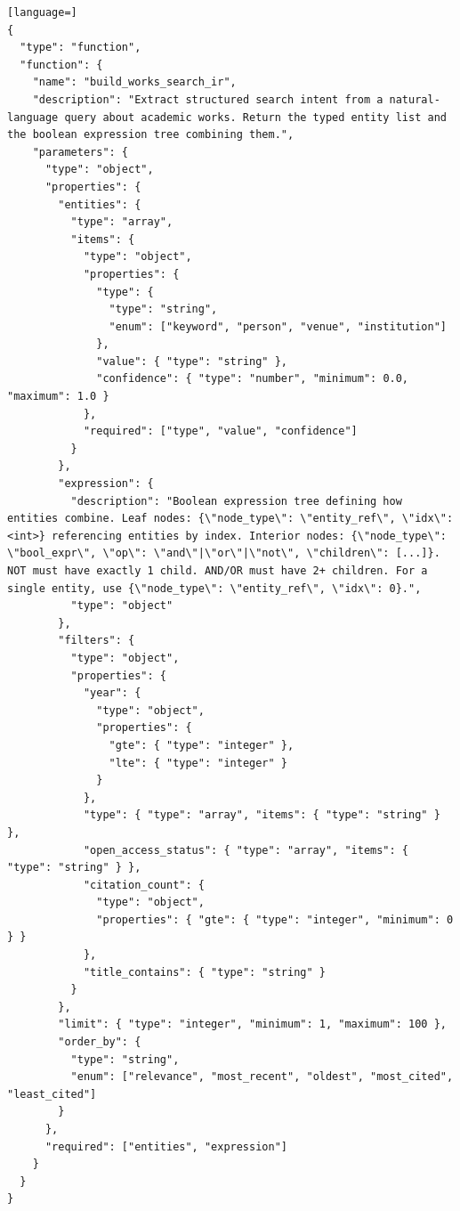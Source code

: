 \begin{lstlisting}[language=]
{
  "type": "function",
  "function": {
    "name": "build_works_search_ir",
    "description": "Extract structured search intent from a natural-language query about academic works. Return the typed entity list and the boolean expression tree combining them.",
    "parameters": {
      "type": "object",
      "properties": {
        "entities": {
          "type": "array",
          "items": {
            "type": "object",
            "properties": {
              "type": {
                "type": "string",
                "enum": ["keyword", "person", "venue", "institution"]
              },
              "value": { "type": "string" },
              "confidence": { "type": "number", "minimum": 0.0, "maximum": 1.0 }
            },
            "required": ["type", "value", "confidence"]
          }
        },
        "expression": {
          "description": "Boolean expression tree defining how entities combine. Leaf nodes: {\"node_type\": \"entity_ref\", \"idx\": <int>} referencing entities by index. Interior nodes: {\"node_type\": \"bool_expr\", \"op\": \"and\"|\"or\"|\"not\", \"children\": [...]}. NOT must have exactly 1 child. AND/OR must have 2+ children. For a single entity, use {\"node_type\": \"entity_ref\", \"idx\": 0}.",
          "type": "object"
        },
        "filters": {
          "type": "object",
          "properties": {
            "year": {
              "type": "object",
              "properties": {
                "gte": { "type": "integer" },
                "lte": { "type": "integer" }
              }
            },
            "type": { "type": "array", "items": { "type": "string" } },
            "open_access_status": { "type": "array", "items": { "type": "string" } },
            "citation_count": {
              "type": "object",
              "properties": { "gte": { "type": "integer", "minimum": 0 } }
            },
            "title_contains": { "type": "string" }
          }
        },
        "limit": { "type": "integer", "minimum": 1, "maximum": 100 },
        "order_by": {
          "type": "string",
          "enum": ["relevance", "most_recent", "oldest", "most_cited", "least_cited"]
        }
      },
      "required": ["entities", "expression"]
    }
  }
}
\end{lstlisting}
